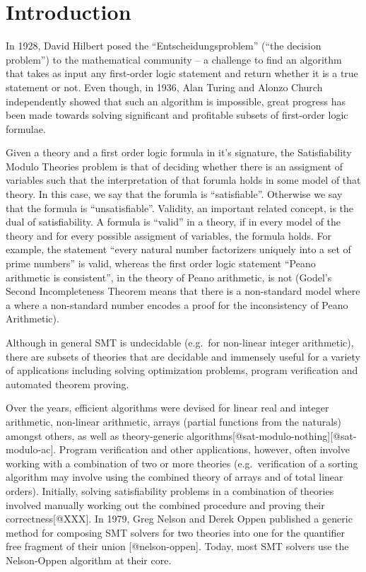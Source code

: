 \documentclass[]{article}
\date{}
\begin{document}
\hypertarget{introduction}{%
\section{Introduction}\label{introduction}}

In 1928, David Hilbert posed the ``Entscheidungsproblem'' (``the
decision problem'') to the mathematical community -- a challenge to find
an algorithm that takes as input any first-order logic statement and
return whether it is a true statement or not. Even though, in 1936, Alan
Turing and Alonzo Church independently showed that such an algorithm is
impossible, great progress has been made towards solving significant and
profitable subsets of first-order logic formulae.

Given a theory and a first order logic formula in it's signature, the
Satisfiability Modulo Theories problem is that of deciding whether there
is an assigment of variables such that the interpretation of that
forumla holds in some model of that theory. In this case, we say that
the forumla is ``satisfiable''. Otherwise we say that the formula is
``unsatisfiable''. Validity, an important related concept, is the dual
of satisfiability. A formula is ``valid'' in a theory, if in every model
of the theory and for every possible assigment of variables, the formula
holds. For example, the statement ``every natural number factorizers
uniquely into a set of prime numbers'' is valid, whereas the first order
logic statement ``Peano arithmetic is consistent'', in the theory of
Peano arithmetic, is not (Godel's Second Incompleteness Theorem means
that there is a non-standard model where a where a non-standard number
encodes a proof for the inconsistency of Peano Arithmetic).

Although in general SMT is undecidable (e.g.~for non-linear integer
arithmetic), there are subsets of theories that are decidable and
immensely useful for a variety of applications including solving
optimization problems, program verification and automated theorem
proving.

Over the years, efficient algorithms were devised for linear real and
integer arithmetic, non-linear arithmetic, arrays (partial functions
from the naturals) amongst others, as well as theory-generic
algorithms{[}@sat-modulo-nothing{]}{[}@sat-modulo-ac{]}. Program
verification and other applications, however, often involve working with
a combination of two or more theories (e.g.~verification of a sorting
algorithm may involve using the combined theory of arrays and of total
linear orders). Initially, solving satisfiability problems in a
combination of theories involved manually working out the combined
procedure and proving their correctness{[}@XXX{]}. In 1979, Greg Nelson
and Derek Oppen published a generic method for composing SMT solvers for
two theories into one for the quantifier free fragment of their union
{[}@nelson-oppen{]}. Today, most SMT solvers use the Nelson-Oppen
algorithm at their core.
\end{document}

